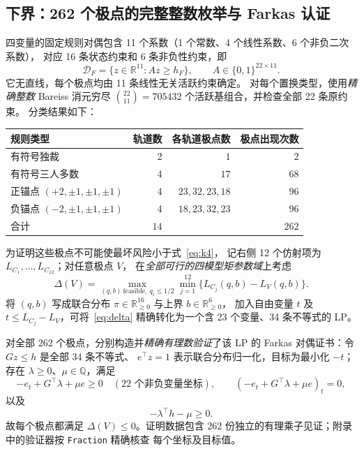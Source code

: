 \documentclass[11pt,a4paper]{ctexart}
\theoremstyle{remark}\newtheorem{remark}[theorem]{备注}
\begin{document}
\subsection{下界：262 个极点的完整整数枚举与 Farkas 认证}
四变量的固定规则对偶包含 11 个系数（1 个常数、4 个线性系数、6 个非负二次系数），
对应 16 条状态约束和 6 条非负性约束，即
\[
\mathcal D_F=\{z\in\mathbb R^{11}:A z\ge h_F\},
\qquad A\in\{0,1\}^{22\times11}.
\]
它无直线，每个极点均由 11 条线性无关活跃约束确定。
对每个置换类型，使用\emph{精确整数} Bareiss 消元穷尽
$\binom{22}{11}=705432$ 个活跃基组合，并检查全部 22 条原约束。
分类结果如下：
\begin{center}\begin{tabular}{lrrr}\toprule
规则类型 & 轨道数 & 各轨道极点数 & 极点出现次数\\\midrule
有符号独裁 & 2 & $1$ & $2$\\
有符号三人多数 & 4 & $17$ & $68$\\
正锚点 $(+2,\pm1,\pm1,\pm1)$ & 4 & $23,32,23,18$ & $96$\\
负锚点 $(-2,\pm1,\pm1,\pm1)$ & 4 & $18,23,32,23$ & $96$\\\midrule
合计 & $14$ & & $262$\\\bottomrule\end{tabular}\end{center}

为证明这些极点不可能使最坏风险小于式~\eqref{eq:k4}，
记右侧 12 个仿射项为 $L_{C_1},\ldots,L_{C_{12}}$；对任意极点 $V$，
在\emph{全部可行的四模型矩参数域}上考虑
\begin{equation}\label{eq:delta}
\Delta(V)=\max_{(q,b)\ \mathrm{feasible},\ q_i\le1/2}
\min_{j=1}^{12}\{L_{C_j}(q,b)-L_V(q,b)\}.
\end{equation}
将 $(q,b)$ 写成联合分布 $\pi\in\mathbb R_{\ge0}^{16}$ 与上界 $b\in\mathbb R_{\ge0}^{6}$，
加入自由变量 $t$ 及 $t\le L_{C_j}-L_V$，可将~\eqref{eq:delta}
精确转化为一个含 23 个变量、34 条不等式的 LP。

对全部 262 个极点，分别构造并\emph{精确有理数验证}了该 LP 的
Farkas 对偶证书：令 $Gz\le h$ 是全部 34 条不等式、
$e^\top z=1$ 表示联合分布归一化，目标为最小化 $-t$；
存在 $\lambda\ge0$、$\mu\in\mathbb Q$，满足
\[
- e_t+G^\top\lambda+\mu e\ge0
\quad(\text{22 个非负变量坐标}),\qquad
(- e_t+G^\top\lambda+\mu e)_t=0,
\]
以及
\begin{equation}\label{eq:farkas}
-\lambda^\top h-\mu\ge0.
\end{equation}
故每个极点都满足 $\Delta(V)\le0$。证明数据包含
262 份独立的有理乘子见证；附录中的验证器按 \texttt{Fraction} 精确核查
每个坐标及目标值。
\end{document}
